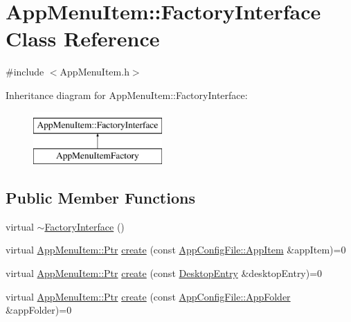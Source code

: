 \hypertarget{classAppMenuItem_1_1FactoryInterface}{}\section{App\+Menu\+Item\+:\+:Factory\+Interface Class Reference}
\label{classAppMenuItem_1_1FactoryInterface}


{\ttfamily \#include $<$App\+Menu\+Item.\+h$>$}

Inheritance diagram for App\+Menu\+Item\+:\+:Factory\+Interface\+:\begin{figure}[H]
\begin{center}
\leavevmode
\includegraphics[height=2.000000cm]{classAppMenuItem_1_1FactoryInterface}
\end{center}
\end{figure}
\subsection*{Public Member Functions}
\begin{DoxyCompactItemize}
\item 
virtual \mbox{\hyperlink{classAppMenuItem_1_1FactoryInterface_af5cf9997d839e15114098f1a0e2a7f56}{$\sim$\+Factory\+Interface}} ()
\item 
virtual \mbox{\hyperlink{classAppMenuItem_ab5f51c5d74f8df62b8862c0cc8126cb7}{App\+Menu\+Item\+::\+Ptr}} \mbox{\hyperlink{classAppMenuItem_1_1FactoryInterface_a5b176b2573b638c01d71f05655d73ba0}{create}} (const \mbox{\hyperlink{structAppConfigFile_1_1AppItem}{App\+Config\+File\+::\+App\+Item}} \&app\+Item)=0
\item 
virtual \mbox{\hyperlink{classAppMenuItem_ab5f51c5d74f8df62b8862c0cc8126cb7}{App\+Menu\+Item\+::\+Ptr}} \mbox{\hyperlink{classAppMenuItem_1_1FactoryInterface_ab4a62330cdbb3e4a0864f354ceb3396f}{create}} (const \mbox{\hyperlink{classDesktopEntry}{Desktop\+Entry}} \&desktop\+Entry)=0
\item 
virtual \mbox{\hyperlink{classAppMenuItem_ab5f51c5d74f8df62b8862c0cc8126cb7}{App\+Menu\+Item\+::\+Ptr}} \mbox{\hyperlink{classAppMenuItem_1_1FactoryInterface_a3b9ef458047ad7c8c5bbae6157466f6c}{create}} (const \mbox{\hyperlink{structAppConfigFile_1_1AppFolder}{App\+Config\+File\+::\+App\+Folder}} \&app\+Folder)=0
\end{DoxyCompactItemize}
